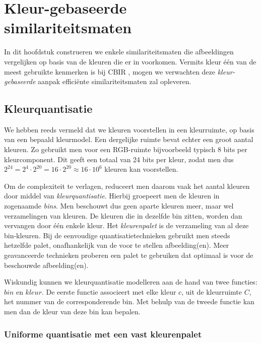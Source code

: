 \chapter{Kleur-gebaseerde similariteitsmaten}

In dit hoofdstuk construeren we enkele similariteitsmaten die afbeeldingen vergelijken op
basis van de kleuren die er in voorkomen. Vermits kleur \'e\'en van de meest gebruikte 
kenmerken is bij CBIR \cite{rui:image_retr}, mogen we verwachten deze \emph{kleur-gebaseerde}
aanpak effici\"ente similariteitsmaten zal opleveren.


\section{Kleurquantisatie}

We hebben reeds vermeld dat we kleuren voorstellen in een kleurruimte, op basis van een bepaald
kleurmodel. Een dergelijke ruimte bevat echter een groot aantal kleuren. Zo gebruikt men
voor een RGB-ruimte bijvoorbeeld typisch 8 bits per kleurcomponent. Dit geeft een totaal van
24 bits per kleur, zodat men dus $2^{24}=2^4 \cdot 2^{20}=16 \cdot 2^{20} \approx 16 \cdot 10^6$
kleuren kan voorstellen. 

Om de complexiteit te verlagen, reduceert men daarom vaak het aantal
kleuren door middel van \emph{kleurquantisatie}. Hierbij groepeert men de kleuren in 
zogenaamde \emph{bins}. Men beschouwt dus geen aparte kleuren meer, maar wel verzamelingen 
van kleuren. De kleuren die in dezelfde bin zitten, worden dan vervangen door \'e\'en enkele
kleur. Het \emph{kleurenpalet} is de verzameling van al deze bin-kleuren.
Bij de eenvoudige quantisatietechnieken
gebruikt men steeds hetzelfde palet, onafhankelijk van de voor te stellen afbeelding(en). Meer
geavanceerde technieken proberen een palet te gebruiken dat optimaal is voor de
beschouwde afbeelding(en).

Wiskundig kunnen we kleurquantisatie modelleren aan de hand van twee functies: $bin$ en
$kleur$. De eerste functie associeert met elke kleur $c$, uit de kleurruimte $C$, het
nummer van de corresponderende bin. Met behulp van de tweede functie kan men dan de kleur
van deze bin kan bepalen.  

\subsection{Uniforme quantisatie met een vast kleurenpalet}

